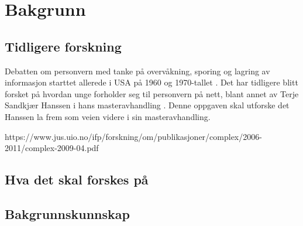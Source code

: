 \section{Bakgrunn}

\subsection{Tidligere forskning}
Debatten om personvern med tanke på overvåkning, sporing og lagring av informasjon starttet allerede i USA på 1960 og 1970-tallet \parencite[36]{bok:nissenbaum}. Det har tidligere blitt forsket på hvordan unge forholder seg til personvern på nett, blant annet av Terje Sandkjær Hanssen i hans masteravhandling \parencite{master:hanssen}. Denne oppgaven skal utforske det Hanssen la frem som veien videre i sin masteravhandling. \parencite[69]{master:hanssen}

https://www.jus.uio.no/ifp/forskning/om/publikasjoner/complex/2006-2011/complex-2009-04.pdf


\subsection{Hva det skal forskes på}

\subsection{Bakgrunnskunnskap}

\newpage